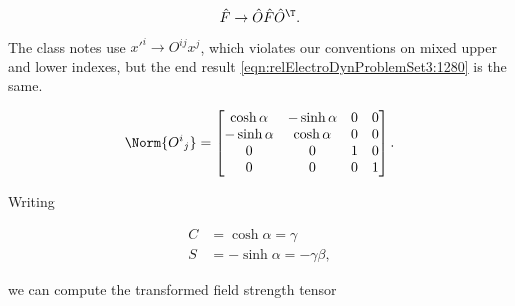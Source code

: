 \begin{equation}\label{eqn:relElectroDynProblemSet3:1280}
\hat{F} \rightarrow \hat{O} \hat{F} \hat{O}^\T.
\end{equation}

The class notes use ${x'}^i \rightarrow O^{ij} x^j$, which violates our conventions on mixed upper and lower indexes, but the end result \ref{eqn:relElectroDynProblemSet3:1280} is the same.

\begin{equation}\label{eqn:relElectroDynProblemSet3:1300}
\Norm{{O^i}_j} =
\begin{bmatrix}
\cosh\alpha & -\sinh\alpha & 0 & 0 \\
-\sinh\alpha & \cosh\alpha & 0 & 0 \\
0 & 0 & 1 & 0 \\
0 & 0 & 0 & 1
\end{bmatrix}.
\end{equation}

Writing

\begin{align}\label{eqn:relElectroDynProblemSet3:1840}
C &= \cosh\alpha = \gamma \\
S &= -\sinh\alpha = -\gamma \beta,
\end{align}

we can compute the transformed field strength tensor

